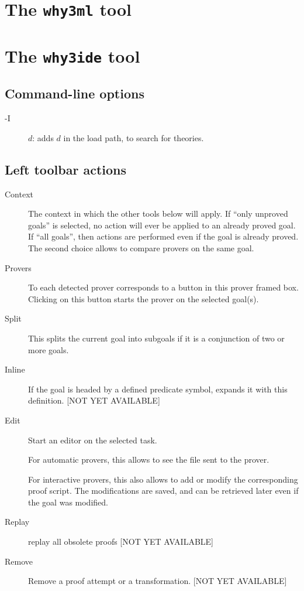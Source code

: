 \section{The \texttt{why3ml} tool}

\section{The \texttt{why3ide} tool}
\label{sec:ideref}

\subsection{Command-line options}

\begin{description}
\item[-I] $d$: adds $d$ in the load path, to search for theories.
\end{description}

\subsection{Left toolbar actions}

\begin{description}
\item[Context] The context in which the other tools below will
  apply. If ``only unproved goals'' is selected, no action will ever
  be applied to an already proved goal.  If ``all goals'', then
  actions are performed even if the goal is already proved. The second
  choice allows to compare provers on the same goal.

\item[Provers] To each detected prover corresponds to a button in this
  prover framed box. Clicking on this button starts the prover on the
  selected goal(s).

\item[Split] This splits the current goal into subgoals if it is a
  conjunction of two or more goals.

\item[Inline] If the goal is headed by a defined predicate symbol,
  expands it with this definition. [NOT YET AVAILABLE]

\item[Edit] Start an editor on the selected task.

  For automatic provers, this allows to see the file sent to the
  prover.

  For interactive provers, this also allows to add or modify the
  corresponding proof script. The modifications are saved, and can be
  retrieved later even if the goal was modified.

\item[Replay] replay all obsolete proofs [NOT YET AVAILABLE]

\item[Remove] Remove a proof attempt or a transformation. [NOT YET AVAILABLE]

\end{description}

